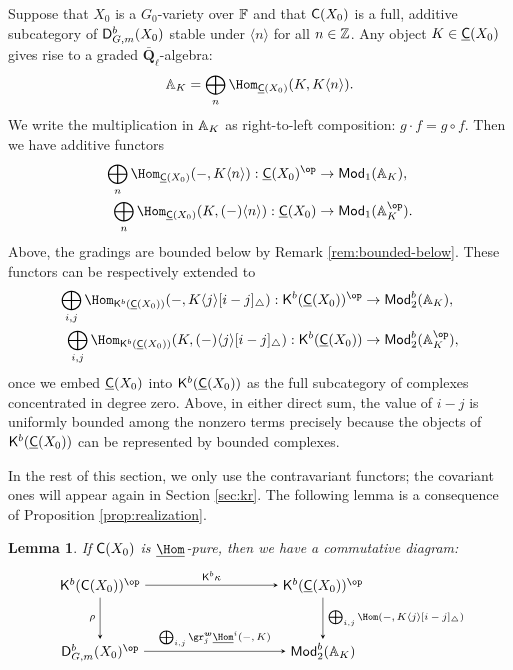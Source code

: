 \documentclass[a4paper,10pt,leqno]{amsart}
\theoremstyle{plain}
\theoremstyle{plain}
\theoremstyle{plain}
\newtheorem{lem}[thm]{Lemma}
\theoremstyle{definition}
\theoremstyle{remark}
\newcommand{\Mod}{\mathsf{Mod}}
\newcommand{\QL}{\bar{\mathbf{Q}}_\ell}
\begin{document}
Suppose that $X_0$ is a $G_0$-variety over $\bb{F}$ and that $\sf{C}(X_0)$ is a full, additive subcategory of $\sf{D}_{G, m}^b(X_0)$ stable under $\langle n\rangle$ for all $n \in \bb{Z}$.
Any object $K \in \underline{\sf{C}}(X_0)$ gives rise to a graded $\QL$-algebra:
\begin{align}
\bb{A}_K = \bigoplus_n
{\Hom_{\underline{\sf{C}}(X_0)}(K, K \langle n\rangle)}.
\end{align}
We write the multiplication in $\bb{A}_K$ as right-to-left composition: $g \cdot f = g \circ f$.
Then we have additive functors
\begin{align}
\bigoplus_n
{\Hom_{\underline{\sf{C}}(X_0)}(-, K\langle n\rangle)}
	: \underline{\sf{C}}(X_0)^\op &\to \Mod_1(\bb{A}_K),\\	
\bigoplus_n
{\Hom_{\underline{\sf{C}}(X_0)}(K, (-)\langle n\rangle)}
	: \underline{\sf{C}}(X_0) &\to \Mod_1(\bb{A}_K^\op).
\end{align}
Above, the gradings are bounded below by Remark \ref{rem:bounded-below}.
These functors can be respectively extended to
\begin{align}
\bigoplus_{i, j} 
{\Hom_{\sf{K}^b(\underline{\sf{C}}(X_0))}(-, K\langle j\rangle [i - j]_\triangle)}
	: \sf{K}^b(\underline{\sf{C}}(X_0))^\op &\to \Mod_2^b(\bb{A}_K),\\	
\bigoplus_{i, j} 
{\Hom_{\sf{K}^b(\underline{\sf{C}}(X_0))}(K, (-)\langle j\rangle [i - j]_\triangle)}
	: \sf{K}^b(\underline{\sf{C}}(X_0)) &\to \Mod_2^b(\bb{A}_K^\op),
\end{align}
once we embed $\underline{\sf{C}}(X_0)$ into $\sf{K}^b(\underline{\sf{C}}(X_0))$ as the full subcategory of complexes concentrated in degree zero.
Above, in either direct sum, the value of $i - j$ is uniformly bounded among the nonzero terms precisely because the objects of $\sf{K}^b(\underline{\sf{C}}(X_0))$ can be represented by bounded complexes.

In the rest of this section, we only use the contravariant functors; the covariant ones will appear again in Section \ref{sec:kr}.
The following lemma is a consequence of Proposition \ref{prop:realization}.

\begin{lem}\label{lem:hom-pure}
If $\sf{C}(X_0)$ is $\SHom$-pure, then we have a commutative diagram:
\begin{equation}
\begin{tikzpicture}[baseline=(current bounding box.center), >=stealth]
\matrix(m)[matrix of math nodes, row sep=3em, column sep=9.5em, text height=2ex, text depth=0.5ex]
{	\sf{K}^b(\sf{C}(X_0))^\op
		&\sf{K}^b(\underline{\sf{C}}(X_0))^\op\\
	\sf{D}_{G, m}^b(X_0)^\op
		&\Mod_2^b(\bb{A}_K)\\
		};
\path[->,font=\scriptsize, auto]
(m-1-1) 	edge node{$\sf{K}^b\kappa$} (m-1-2)
			edge node[left]{$\rho$} (m-2-1)
(m-1-2)		edge node{$\bigoplus_{i, j} \Hom(-, K\langle j\rangle [i - j]_\triangle)$} (m-2-2)
(m-2-1)		edge node{$\bigoplus_{i, j} \gr_j^{\bm{w}} \SHom^i(-, K)$} (m-2-2);
\end{tikzpicture}
\end{equation}
\end{lem}
\end{document}
